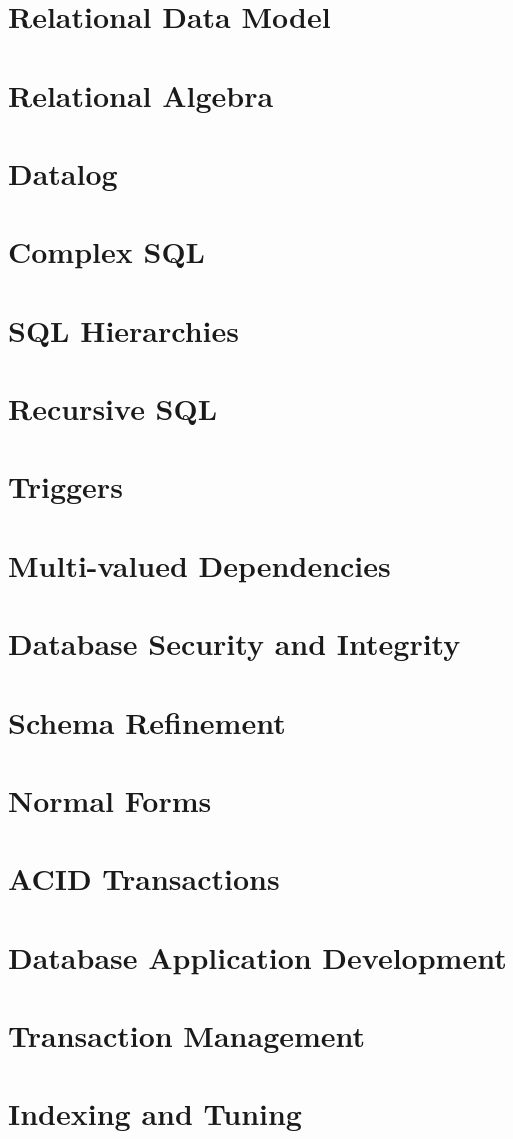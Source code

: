 



\part{Relational Data Model}

\part{Relational Algebra}

\part{Datalog}

\part{Complex SQL}

\part{SQL Hierarchies}

\part{Recursive SQL}

\part{Triggers}

\part{Multi-valued Dependencies}

\part{Database Security and Integrity}

\part{Schema Refinement}

\part{Normal Forms}

\part{ACID Transactions}

\part{Database Application Development}

\part{Transaction Management}

\part{Indexing and Tuning}






